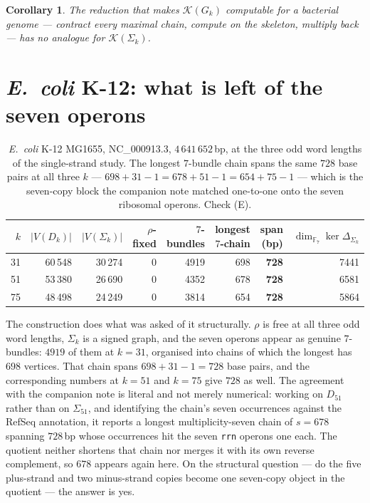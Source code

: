 \documentclass[11pt]{article}
\theoremstyle{plain}
\newtheorem{corollary}[theorem]{Corollary}
\theoremstyle{definition}
\theoremstyle{remark}
\newcommand{\K}{\mathcal{K}}
\newcommand{\Sig}{\Sigma}
\begin{document}
\begin{corollary}\label{cor:nocompute}
The reduction that makes $\K(G_k)$ computable for a bacterial genome --- contract every
maximal chain, compute on the skeleton, multiply back --- has no analogue for $\K(\Sig_k)$.
\end{corollary}

\section{\emph{E.\ coli} K-12: what is left of the seven operons}

\begin{table}[t]
\centering
\begin{tabular}{rrrrrrrr}
\toprule
$k$ & $|V(D_k)|$ & $|V(\Sig_k)|$ & $\rho$-fixed & $7$-bundles & longest $7$-chain
& span (bp) & $\dim_{\mathbb{F}_7}\ker\Delta_{\Sig_k}$\\
\midrule
31 & 60\,548 & 30\,274 & 0 & 4919 & 698 & \textbf{728} & 7441\\
51 & 53\,380 & 26\,690 & 0 & 4352 & 678 & \textbf{728} & 6581\\
75 & 48\,498 & 24\,249 & 0 & 3814 & 654 & \textbf{728} & 5864\\
\bottomrule
\end{tabular}
\caption{\emph{E.\ coli} K-12 MG1655, NC\_000913.3, $4\,641\,652$\,bp, at the three odd word
lengths of the single-strand study. The longest $7$-bundle chain spans the same $728$
base pairs at all three $k$ --- $698+31-1=678+51-1=654+75-1$ --- which is the seven-copy
block the companion note matched one-to-one onto the seven ribosomal operons. Check (E).}
\label{tab:ecoli}
\end{table}

The construction does what was asked of it structurally. $\rho$ is free at all three odd word
lengths, $\Sig_k$ is a signed graph, and the seven operons appear as genuine $7$-bundles:
$4919$ of them at $k=31$, organised into chains of which the longest has $698$ vertices. That
chain spans $698+31-1=728$ base pairs, and the corresponding numbers at $k=51$ and $k=75$
give $728$ as well. The agreement with the companion note is literal and not merely
numerical: working on $D_{51}$ rather than on $\Sig_{51}$, and identifying the chain's seven
occurrences against the RefSeq annotation, it reports a longest multiplicity-seven chain of
$s=678$ spanning $728$\,bp whose occurrences hit the seven \texttt{rrn} operons one each.
The quotient neither shortens that chain nor merges it with its own reverse complement, so
$678$ appears again here. On the structural question --- do the five plus-strand and two
minus-strand copies become one seven-copy object in the quotient --- the answer is yes.
\end{document}

